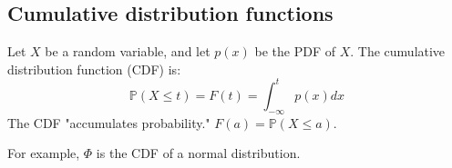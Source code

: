 \documentclass[titlepage, 12pt, leqno]{article}
\begin{document}
\subsection{Cumulative distribution functions}
Let $X$ be a random variable, and let $p(x)$ be the PDF of $X$. The cumulative
distribution function (CDF) is:
\[
\mathbb{P}(X \le t) = F(t) = \int_{-\infty}^{t}p(x)dx
\]
The CDF "accumulates probability." $F(a) = \mathbb{P}(X \le a)$.

For example, $\Phi$ is the CDF of a normal distribution.
\end{document}
